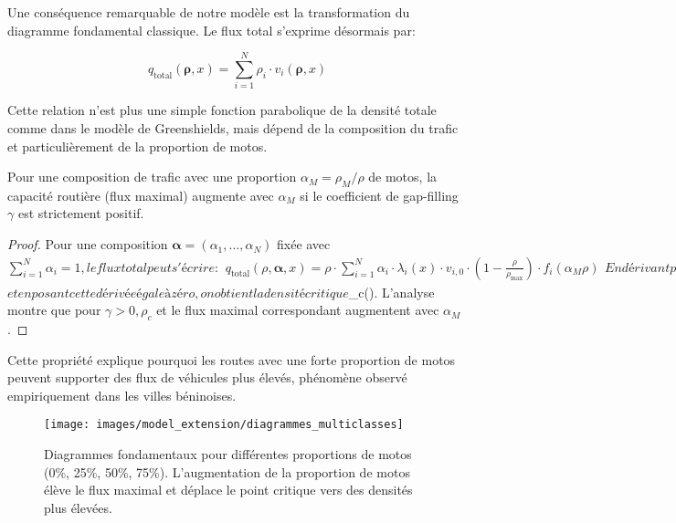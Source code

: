 Une conséquence remarquable de notre modèle est la transformation du diagramme fondamental classique. Le flux total s'exprime désormais par:

\begin{equation}
q_{\text{total}}(\boldsymbol{\rho}, x) = \sum_{i=1}^N \rho_i \cdot v_i(\boldsymbol{\rho}, x)
\label{eq:flux_total}
\end{equation}

Cette relation n'est plus une simple fonction parabolique de la densité totale comme dans le modèle de Greenshields, mais dépend de la composition du trafic et particulièrement de la proportion de motos.

\begin{proposition}
Pour une composition de trafic avec une proportion $\alpha_M = \rho_M/\rho$ de motos, la capacité routière (flux maximal) augmente avec $\alpha_M$ si le coefficient de gap-filling $\gamma$ est strictement positif.
\end{proposition}

\begin{proof}
Pour une composition $\boldsymbol{\alpha} = (\alpha_1, \ldots, \alpha_N)$ fixée avec $\sum_{i=1}^N \alpha_i = 1, le flux total peut s'écrire:
\begin{align}
q_{\text{total}}(\rho, \boldsymbol{\alpha}, x) = \rho \cdot \sum_{i=1}^N \alpha_i \cdot \lambda_i(x) \cdot v_{i,0} \cdot \left(1 - \frac{\rho}{\rho_{\max}}\right) \cdot f_i(\alpha_M \rho)
\end{align}

En dérivant par rapport à $\rho$ et en posant cette dérivée égale à zéro, on obtient la densité critique $\rho_c(\boldsymbol{\alpha}). L'analyse montre que pour $\gamma > 0, \rho_c$ et le flux maximal correspondant augmentent avec $\alpha_M$.
\end{proof}

Cette propriété explique pourquoi les routes avec une forte proportion de motos peuvent supporter des flux de véhicules plus élevés, phénomène observé empiriquement dans les villes béninoises.

\begin{figure}[htbp]
\centering
\texttt{[image: images/model\_extension/diagrammes\_multiclasses]}
\caption{Diagrammes fondamentaux pour différentes proportions de motos (0\%, 25\%, 50\%, 75\%). L'augmentation de la proportion de motos élève le flux maximal et déplace le point critique vers des densités plus élevées.}
\label{fig:diagramme_multiclasse}
\end{figure}

